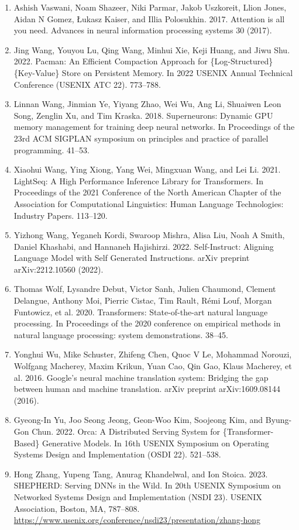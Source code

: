 \documentclass[11pt,UTF8,fontset=fandol]{ctexart}
\begin{document}
\begin{enumerate}[leftmargin=2.2em,labelsep=0.6em,itemsep=0.25em]
\item Ashish Vaswani, Noam Shazeer, Niki Parmar, Jakob Uszkoreit, Llion Jones, Aidan N Gomez, Łukasz Kaiser, and Illia Polosukhin. 2017. Attention is all you need. Advances in neural information processing systems 30 (2017).
\item Jing Wang, Youyou Lu, Qing Wang, Minhui Xie, Keji Huang, and Jiwu Shu. 2022. Pacman: An Efficient Compaction Approach for \{Log-Structured\} \{Key-Value\} Store on Persistent Memory. In 2022 USENIX Annual Technical Conference (USENIX ATC 22). 773--788.
\item Linnan Wang, Jinmian Ye, Yiyang Zhao, Wei Wu, Ang Li, Shuaiwen Leon Song, Zenglin Xu, and Tim Kraska. 2018. Superneurons: Dynamic GPU memory management for training deep neural networks. In Proceedings of the 23rd ACM SIGPLAN symposium on principles and practice of parallel programming. 41--53.
\item Xiaohui Wang, Ying Xiong, Yang Wei, Mingxuan Wang, and Lei Li. 2021. LightSeq: A High Performance Inference Library for Transformers. In Proceedings of the 2021 Conference of the North American Chapter of the Association for Computational Linguistics: Human Language Technologies: Industry Papers. 113--120.
\item Yizhong Wang, Yeganeh Kordi, Swaroop Mishra, Alisa Liu, Noah A Smith, Daniel Khashabi, and Hannaneh Hajishirzi. 2022. Self-Instruct: Aligning Language Model with Self Generated Instructions. arXiv preprint arXiv:2212.10560 (2022).
\item Thomas Wolf, Lysandre Debut, Victor Sanh, Julien Chaumond, Clement Delangue, Anthony Moi, Pierric Cistac, Tim Rault, Rémi Louf, Morgan Funtowicz, et al. 2020. Transformers: State-of-the-art natural language processing. In Proceedings of the 2020 conference on empirical methods in natural language processing: system demonstrations. 38--45.
\item Yonghui Wu, Mike Schuster, Zhifeng Chen, Quoc V Le, Mohammad Norouzi, Wolfgang Macherey, Maxim Krikun, Yuan Cao, Qin Gao, Klaus Macherey, et al. 2016. Google's neural machine translation system: Bridging the gap between human and machine translation. arXiv preprint arXiv:1609.08144 (2016).
\item Gyeong-In Yu, Joo Seong Jeong, Geon-Woo Kim, Soojeong Kim, and Byung-Gon Chun. 2022. Orca: A Distributed Serving System for \{Transformer-Based\} Generative Models. In 16th USENIX Symposium on Operating Systems Design and Implementation (OSDI 22). 521--538.
\item Hong Zhang, Yupeng Tang, Anurag Khandelwal, and Ion Stoica. 2023. SHEPHERD: Serving DNNs in the Wild. In 20th USENIX Symposium on Networked Systems Design and Implementation (NSDI 23). USENIX Association, Boston, MA, 787--808. \url{https://www.usenix.org/conference/nsdi23/presentation/zhang-hong}

\end{enumerate}
\end{document}
